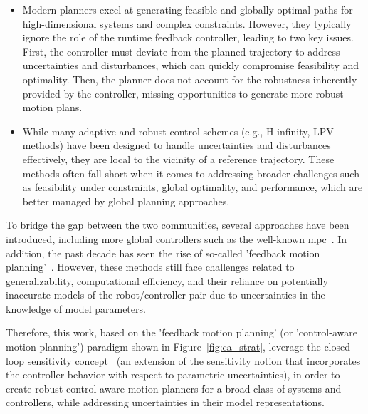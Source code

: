 \begin{itemize}
  \item Modern planners excel at generating feasible and globally optimal paths for high-dimensional systems and complex constraints. 
  However, they typically ignore the role of the runtime feedback controller, leading to two key issues.
  First, the controller must deviate from the planned trajectory to address uncertainties and disturbances, which can quickly compromise feasibility and optimality.
  Then, the planner does not account for the robustness inherently provided by the controller, missing opportunities to generate more robust motion plans.
  \item While many adaptive and robust control schemes (e.g., H-infinity, LPV methods) have been designed to handle uncertainties and disturbances effectively, they are local to the vicinity of a reference trajectory. 
  These methods often fall short when it comes to addressing broader challenges such as feasibility under constraints, global optimality, and performance, which are better managed by global planning approaches.
\end{itemize}
    
To bridge the gap between the two communities, several approaches have been introduced, including more global controllers such as the well-known \gls{mpc}~\cite{cTMPC}. 
In addition, the past decade has seen the rise of so-called 'feedback motion planning'~\cite{cTognon, cContractThMP, cContractThOnlineMP, cMajundarLibrary, cFaSTrack, cRandUpRRT, cRandUP}. 
However, these methods still face challenges related to generalizability, computational efficiency, and their reliance on potentially inaccurate models of the robot/controller pair due to uncertainties in the knowledge of model parameters.

Therefore, this work, based on the 'feedback motion planning' (or 'control-aware motion planning') paradigm shown in Figure~\ref{fig:ca_strat}, leverage the closed-loop sensitivity concept~\cite{cPi,cTh} (an extension of the sensitivity notion that incorporates the controller behavior with respect to parametric uncertainties), in order to create robust control-aware motion planners for a broad class of systems and controllers, while addressing uncertainties in their model representations.

